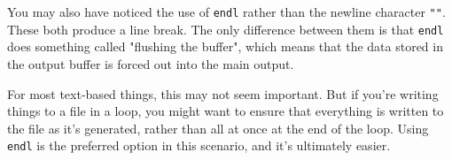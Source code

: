 You may also have noticed the use of \texttt{endl} rather than the newline character \texttt{"\n"}.  These both produce a line break.  The only difference between them is that \texttt{endl} does something called "flushing the buffer", which means that the data stored in the output buffer is forced out into the main output.

For most text-based things, this may not seem important.  But if you're writing things to a file in a loop, you might want to ensure that everything is written to the file as it's generated, rather than all at once at the end of the loop.  Using \texttt{endl} is the preferred option in this scenario, and it's ultimately easier.
